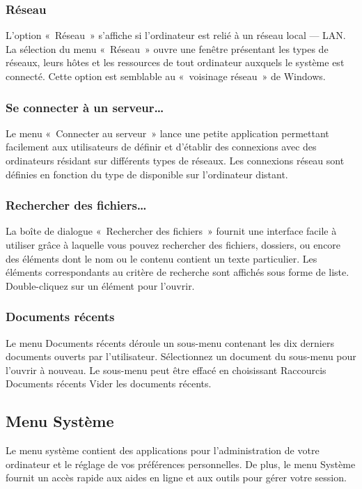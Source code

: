 \subsubsection{Réseau}
L'option «~Réseau~» s'affiche si l'ordinateur est relié à un réseau local --- LAN. La sélection du menu «~Réseau~» ouvre une fenêtre présentant les types de réseaux, leurs hôtes et les ressources de tout ordinateur auxquels le système est connecté. Cette option est semblable au «~voisinage réseau~» de Windows.
\subsubsection{Se connecter à un serveur\ldots{}}
Le menu «~Connecter au serveur~» lance une petite application permettant facilement aux utilisateurs de définir et d'établir des connexions avec des ordinateurs résidant sur différents types de réseaux. Les connexions réseau sont définies en fonction du type de  disponible sur l'ordinateur distant. 
\subsubsection{Rechercher des fichiers\ldots{}}
La boîte de dialogue «~Rechercher des fichiers~» fournit une interface facile à utiliser grâce à laquelle vous pouvez rechercher des fichiers, dossiers, ou encore des éléments dont le nom ou le contenu contient un texte particulier. Les éléments correspondants au critère de recherche sont affichés sous forme de liste. Double-cliquez sur un élément pour l'ouvrir. 
\subsubsection{Documents récents}
Le menu Documents récents déroule un sous-menu contenant les dix derniers documents ouverts par l'utilisateur. Sélectionnez un document du sous-menu pour l'ouvrir à nouveau. Le sous-menu peut être effacé en choisissant Raccourcis \FlecheDroite  Documents récents \FlecheDroite  Vider les documents récents.
\subsection{Menu Système}
Le menu système contient des applications pour l'administration de votre ordinateur et le réglage de vos préférences personnelles. De plus, le menu Système fournit un accès rapide aux aides en ligne et aux outils pour gérer votre session. 
